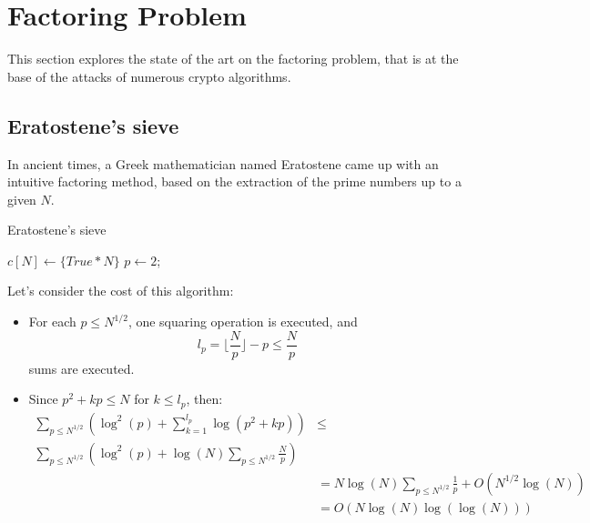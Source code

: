 \section{Factoring Problem}
This section explores the state of the art on the factoring problem, that is at the base of the attacks of numerous crypto algorithms. \newline
\subsection{Eratostene's sieve}
In ancient times, a Greek mathematician named Eratostene came up with an intuitive factoring method, based on the extraction of the prime numbers up to a given $N$.
\begin{algorithm}
\caption{Eratostene's sieve}\label{alg:eratostene_sieve}
$c[N] \gets \{True * N\}$\;
$p \gets 2$;
\;
\end{algorithm}
Let's consider the cost of this algorithm:
\begin{itemize}
    \item For each $p \leq N^{1/2}$, one squaring operation is executed, and
    \[
    l_{p} = \lfloor \frac{N}{p} \rfloor - p \leq \frac{N}{p}
    \]
    sums are executed.
    \item Since $p^{2} + kp \leq N$ for $k \leq l_{p}$, then:
    \begin{align*}
        \sum_{p \leq N^{1/2}} (\operatorname{log}^{2}(p) + \sum_{k=1}^{l_{p}} \operatorname{log}(p^{2} + kp)) & \leq \\
        \sum_{p \leq N^{1/2}} (\operatorname{log}^{2}(p) + \operatorname{log}(N) \sum_{p \leq N^{1/2}} \frac{N}{p})\\
        & = N \operatorname{log}(N) \sum_{p \leq N^{1/2}} \frac{1}{p} + O(N^{1/2} \operatorname{log}(N)) \\
        & = O(N \operatorname{log}(N) \operatorname{log}(\operatorname{log}(N)))
    \end{align*}
\end{itemize}

